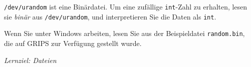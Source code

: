 \documentclass[
	ngerman,
	fontsize=10pt,
	parskip=half,
	titlepage=true,
	DIV=12
]{scrartcl}
\begin{document}
\texttt{/dev/urandom} ist eine Binärdatei. Um eine zufällige \texttt{int}-Zahl zu erhalten,
lesen sie \emph{binär} aus \texttt{/dev/urandom}, und interpretieren Sie die Daten als \texttt{int}.

Wenn Sie unter Windows arbeiten, lesen Sie aus der Beispieldatei \texttt{random.bin}, die auf GRIPS zur Verfügung gestellt wurde.

\emph{Lernziel: Dateien}
\end{document}
